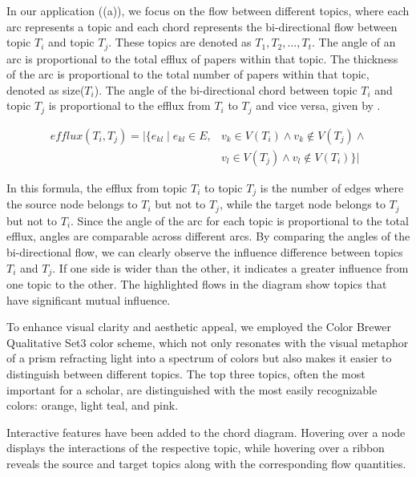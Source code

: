 In our application ((a)), we focus on the flow between different topics, where each arc represents a topic and each chord represents the bi-directional flow between topic \(T_i\) and topic \(T_j\). These topics are denoted as \(T_1, T_2, \ldots, T_t\). The angle of an arc is proportional to the total efflux of papers within that topic. The thickness of the arc is proportional to the total number of papers within that topic, denoted as size(\(T_i\)). The angle of the bi-directional chord between topic \(T_i\) and topic \(T_j\) is proportional to the efflux from \(T_i\) to \(T_j\) and vice versa, given by .

\begin{equation}
\begin{aligned}
efflux(T_i, T_j) = | \{ e_{kl} \mid e_{kl} \in E, &v_k \in V(T_i) \wedge v_k \notin V(T_j) \wedge \\
&v_l \in V(T_j) \wedge v_l \notin V(T_i) \} |
\end{aligned}
\label{eq:efflux}
\end{equation}


In this formula, the efflux from topic \(T_i\) to topic \(T_j\) is the number of edges where the source node belongs to \(T_i\) but not to \(T_j\), while the target node belongs to \(T_j\) but not to \(T_i\). Since the angle of the arc for each topic is proportional to the total efflux, angles are comparable across different arcs. By comparing the angles of the bi-directional flow, we can clearly observe the influence difference between topics \(T_i\) and \(T_j\). If one side is wider than the other, it indicates a greater influence from one topic to the other. The highlighted flows in the diagram show topics that have significant mutual influence.

To enhance visual clarity and aesthetic appeal, we employed the Color Brewer Qualitative Set3 color scheme, which not only resonates with the visual metaphor of a prism refracting light into a spectrum of colors but also makes it easier to distinguish between different topics. The top three topics, often the most important for a scholar, are distinguished with the most easily recognizable colors: orange, light teal, and pink.

Interactive features have been added to the chord diagram. Hovering over a node displays the interactions of the respective topic, while hovering over a ribbon reveals the source and target topics along with the corresponding flow quantities.

